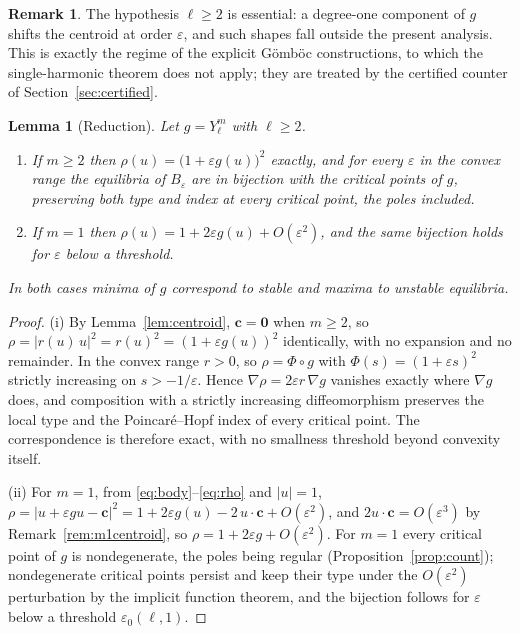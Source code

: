 \documentclass[11pt,a4paper]{article}
\newtheorem{lemma}{Lemma}
\theoremstyle{definition}
\newtheorem{remark}{Remark}
\begin{document}
\begin{remark}
The hypothesis $\ell\ge2$ is essential: a degree-one component of $g$ shifts the centroid at order
$\varepsilon$, and such shapes fall outside the present analysis. This is exactly the regime of the explicit
G\"omb\"oc constructions, to which the single-harmonic theorem does not apply; they are treated by the
certified counter of Section~\ref{sec:certified}.
\end{remark}

\begin{lemma}[Reduction]\label{lem:reduction}
Let $g=Y_\ell^m$ with $\ell\ge2$.
\begin{enumerate}[nosep,label=(\roman*)]
\item If $m\ge2$ then $\rho(u)=\big(1+\varepsilon g(u)\big)^2$ \emph{exactly}, and for every $\varepsilon$ in
the convex range the equilibria of $B_\varepsilon$ are in bijection with the critical points of $g$,
preserving both type and index at every critical point, the poles included.
\item If $m=1$ then $\rho(u)=1+2\varepsilon g(u)+O(\varepsilon^2)$, and the same bijection holds for
$\varepsilon$ below a threshold.
\end{enumerate}
In both cases minima of $g$ correspond to stable and maxima to unstable equilibria.
\end{lemma}
\begin{proof}
(i) By Lemma~\ref{lem:centroid}, $\mathbf{c}=\mathbf{0}$ when $m\ge2$, so
$\rho=\lvert r(u)\,u\rvert^2=r(u)^2=(1+\varepsilon g(u))^2$ identically, with no expansion and no remainder.
In the convex range $r>0$, so $\rho=\Phi\circ g$ with $\Phi(s)=(1+\varepsilon s)^2$ strictly increasing on
$s>-1/\varepsilon$. Hence $\nabla\rho=2\varepsilon r\,\nabla g$ vanishes exactly where $\nabla g$ does, and
composition with a strictly increasing diffeomorphism preserves the local type and the Poincar\'e--Hopf index
of every critical point. The correspondence is therefore exact, with no smallness threshold beyond convexity
itself.

(ii) For $m=1$, from \eqref{eq:body}--\eqref{eq:rho} and $\lvert u\rvert=1$,
$\rho=\lvert u+\varepsilon g u-\mathbf{c}\rvert^2=1+2\varepsilon g(u)-2\,u\!\cdot\!\mathbf{c}+O(\varepsilon^2)$,
and $2u\!\cdot\!\mathbf{c}=O(\varepsilon^3)$ by Remark~\ref{rem:m1centroid}, so
$\rho=1+2\varepsilon g+O(\varepsilon^2)$. For $m=1$ every critical point of $g$ is nondegenerate, the poles
being regular (Proposition~\ref{prop:count}); nondegenerate critical points persist and keep their type under
the $O(\varepsilon^2)$ perturbation by the implicit function theorem, and the bijection follows for
$\varepsilon$ below a threshold $\varepsilon_0(\ell,1)$.
\end{proof}
\end{document}
